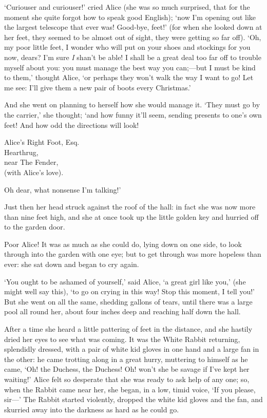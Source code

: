 \documentclass[12pt,openany]{memoir}
\renewenvironment{quote}%
  {\list{}{\leftmargin=2\parindent\rightmargin=0in}\item[]}%
  {\endlist}
\begin{document}
`Curiouser and curiouser!' cried Alice (she was so much surprised, that for the moment she quite forgot how to speak good English); `now I'm opening out like the largest telescope that ever was! Good-bye, feet!' (for when she looked down at her feet, they seemed to be almost out of sight, they were getting so far off). `Oh, my poor little feet, I wonder who will put on your shoes and stockings for you now, dears? I'm sure \textit{I} shan't be able! I shall be a great deal too far off to trouble myself about you: you must manage the best way you can;---but I must be kind to them,' thought Alice, `or perhaps they won't walk the way I want to go! Let me see: I'll give them a new pair of boots every Christmas.'

And she went on planning to herself how she would manage it. `They must go by the carrier,' she thought; `and how funny it'll seem, sending presents to one's own feet! And how odd the directions will look!

\begin{quote}
Alice's Right Foot, Esq.\\
\hspace*{1em}Hearthrug,\\
\hspace*{2em}near The Fender,\\
\hspace*{3em}(with Alice's love).
\end{quote}

Oh dear, what nonsense I'm talking!'

Just then her head struck against the roof of the hall: in fact she was now more than nine feet high, and she at once took up the little golden key and hurried off to the garden door.

Poor Alice! It was as much as she could do, lying down on one side, to look through into the garden with one eye; but to get through was more hopeless than ever: she sat down and began to cry again.

`You ought to be ashamed of yourself,' said Alice, `a great girl like you,' (she might well say this), `to go on crying in this way! Stop this moment, I tell you!' But she went on all the same, shedding gallons of tears, until there was a large pool all round her, about four inches deep and reaching half down the hall.

After a time she heard a little pattering of feet in the distance, and she hastily dried her eyes to see what was coming. It was the White Rabbit returning, splendidly dressed, with a pair of white kid gloves in one hand and a large fan in the other: he came trotting along in a great hurry, muttering to himself as he came, `Oh! the Duchess, the Duchess! Oh! won't she be savage if I've kept her waiting!' Alice felt so desperate that she was ready to ask help of any one; so, when the Rabbit came near her, she began, in a low, timid voice, `If you please, sir---' The Rabbit started violently, dropped the white kid gloves and the fan, and skurried away into the darkness as hard as he could go.
\end{document}
